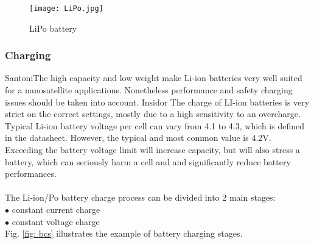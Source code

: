 \begin{figure}[h]
	\centering
	\texttt{[image: LiPo.jpg]}
	\caption{ LiPo battery \cite{12}}
	\label{fig: lipo}
\end{figure}



\subsubsection{Charging}

Santoni\cite{13}The high capacity and low weight make Li-ion batteries very well suited for a nanosatellite applications. Nonetheless performance and safety charging issues should be taken into account. Insidor\cite{14} The charge of LI-ion batteries is very strict on the correct settings, mostly due to a high sensitivity to an overcharge. Typical Li-ion battery voltage per cell can vary from 4.1 to 4.3, which is defined in the datasheet. However, the typical and most common value is 4.2V. Exceeding the battery voltage limit will increase capacity, but will also stress a battery, which can seriously harm a cell and and significantly reduce battery performances.\\ \\
The Li-ion/Po battery charge process can be divided into 2 main stages:\\
$\bullet$ constant current charge\\
$\bullet$ constant voltage charge\\

Fig. \ref{fig: bcs} illustrates the example of battery charging stages.

